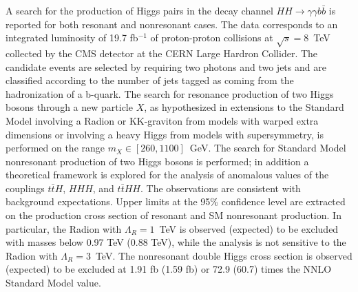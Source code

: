 A search for the production of Higgs pairs in the decay channel
$HH \rightarrow \gamma\gamma b\bar{b}$ is reported for both
resonant and nonresonant cases. The data corresponds to an integrated
luminosity of 19.7 fb$^{-1}$ of proton-proton collisions at $\sqrt{s}=8$~TeV collected by the
CMS detector at the CERN Large Hardron Collider.
The candidate events are selected by requiring two photons and two jets and are classified
according to the number of jets tagged as coming from the hadronization of a b-quark.
The search for resonance production of two Higgs bosons
through a new particle $X$, as hypothesized in extensions
to the Standard Model involving a Radion or KK-graviton from models with warped extra dimensions
or involving a heavy Higgs from models with supersymmetry,
is performed on the range $m_X \in [260, 1100]$~GeV.
The search for Standard Model nonresonant production of two Higgs bosons
is performed; in addition
a theoretical framework is explored for the analysis of anomalous values of the couplings
$t\bar{t}H$, $HHH$, and $t\bar{t}HH$.
The observations are consistent with background expectations.
Upper limits at the 95\% confidence level are extracted on the production cross section
of resonant and SM nonresonant production.
In particular, the Radion with $\Lambda_R = 1$~TeV is observed (expected) to be excluded with masses
below 0.97 TeV (0.88 TeV), while the analysis is not sensitive to the Radion with $\Lambda_R = 3$~TeV.
The nonresonant double Higgs cross section is observed (expected) to be excluded at
1.91 fb (1.59 fb) or 72.9 (60.7) times the NNLO Standard Model value.
